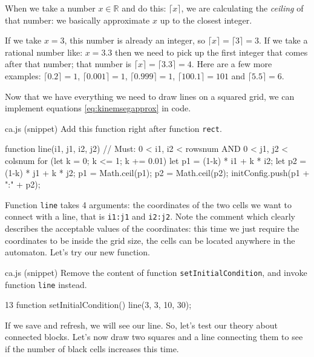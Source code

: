 When we take a number $x \in \mathbb{R}$ and do this: $\lceil x \rceil$, we are calculating
the \textit{ceiling} of that number: we basically approximate $x$ up to the closest integer.

\begin{example}
If we take $x = 3$, this number is already an integer, so $\lceil x \rceil = \lceil 3 \rceil = 3$.
If we take a rational number like: $x = 3.3$ then we need to pick up the first integer that
comes after that number; that number is $\lceil x \rceil = \lceil 3.3 \rceil = 4$.
Here are a few more examples: $\lceil 0.2 \rceil = 1$, $\lceil 0.001 \rceil = 1$,
$\lceil 0.999 \rceil = 1$, $\lceil 100.1 \rceil = 101$ and $\lceil 5.5 \rceil = 6$.
\end{example}

Now that we have everything we need to draw lines on a squared grid, we can implement
equations \ref{eq:kinemsegapprox} in code.

\begin{programcode}{ca.js (snippet)}
Add this function right after function \texttt{rect}.
\begin{code}
function line(i1, j1, i2, j2) {
  // Must: 0 < i1, i2 < rowsnum AND 0 < j1, j2 < colsnum
  for (let k = 0; k <= 1; k += 0.01) {
    let p1 = (1-k) * i1 + k * i2;
    let p2 = (1-k) * j1 + k * j2;
    p1 = Math.ceil(p1);
    p2 = Math.ceil(p2);
    initConfig.push(p1 + ":" + p2);
  }
}
\end{code}
\end{programcode}

Function \texttt{line} takes 4 arguments: the coordinates of the two cells we want to connect
with a line, that is \texttt{i1:j1} and \texttt{i2:j2}. Note the comment which clearly
describes the acceptable values of the coordinates: this time we just require the coordinates
to be inside the grid size, the cells can be located anywhere in the automaton. Let's try our
new function.

\begin{programcode}{ca.js (snippet)}
Remove the content of function \texttt{setInitialCondition}, and invoke function \texttt{line}
instead.
\begin{codeh1}{1}{3}
function setInitialCondition() {
  line(3, 3, 10, 30);
}
\end{codeh1}
\end{programcode}

If we save and refresh, we will see our line.
So, let's test our theory about connected blocks. Let's now draw two squares and a line connecting
them to see if the number of black cells increases this time.

